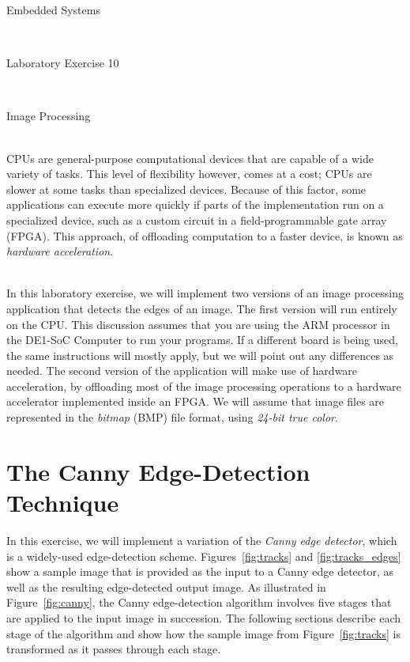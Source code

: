 \documentclass[epsfig,10pt,fullpage]{article}
\newcommand{\LabNum}{10}
\begin{document}
\centerline{\huge Embedded Systems}
~\\
\centerline{\huge Laboratory Exercise \LabNum}
~\\
\centerline{\large Image Processing}
~\\

\noindent
CPUs are general-purpose computational devices that are capable of a wide variety of tasks. 
This level of flexibility however, comes at a cost; CPUs are slower at some tasks than 
specialized devices. Because of this factor, some applications can execute more quickly if 
parts of the implementation run on a specialized device, such as a custom circuit in a
field-programmable gate array (FPGA). This approach, of offloading computation to a faster
device, is known as \textit{hardware acceleration}.

\noindent
~\\
In this laboratory exercise, we will implement two versions of an image processing application
that detects the edges of an image. The first version will run entirely on the CPU. This
discussion assumes that you are using the ARM processor in the DE1-SoC Computer to run your 
programs. If a different board is being used, the same instructions will mostly apply, but we 
will point out any differences as needed. The second version of the application will
make use of hardware acceleration, by offloading most of the image processing operations to 
a hardware accelerator implemented inside an FPGA. We will assume that image files are 
represented in the {\it bitmap} (BMP) file format, using {\it 24-bit true color}.

\noindent
\section*{The Canny Edge-Detection Technique}

\noindent
In this exercise, we will implement a variation of the \textit{Canny edge detector}, which is 
a widely-used edge-detection scheme. Figures~\ref{fig:tracks} and \ref{fig:tracks_edges} 
show a sample image that is provided as the input to a Canny edge detector, as well as the 
resulting edge-detected output image. 
As illustrated in Figure~\ref{fig:canny}, the Canny edge-detection algorithm involves five
stages that are applied to the input image in succession. The following 
sections describe each stage of the algorithm and show how the sample image from 
Figure~\ref{fig:tracks} is transformed as it passes through each stage.
\end{document}
